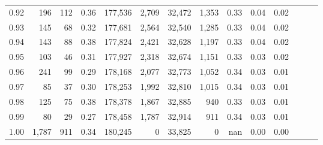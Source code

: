 \begin{tabular}{rrrrrrrrrrrrrr}
0.92 &    196 &  112 &  0.36 &  177,536 &    2,709 &  32,472 &   1,353 &  0.33 &  0.04 &      0.02 \\
0.93 &    145 &   68 &  0.32 &  177,681 &    2,564 &  32,540 &   1,285 &  0.33 &  0.04 &      0.02 \\
0.94 &    143 &   88 &  0.38 &  177,824 &    2,421 &  32,628 &   1,197 &  0.33 &  0.04 &      0.02 \\
0.95 &    103 &   46 &  0.31 &  177,927 &    2,318 &  32,674 &   1,151 &  0.33 &  0.03 &      0.02 \\
0.96 &    241 &   99 &  0.29 &  178,168 &    2,077 &  32,773 &   1,052 &  0.34 &  0.03 &      0.01 \\
0.97 &     85 &   37 &  0.30 &  178,253 &    1,992 &  32,810 &   1,015 &  0.34 &  0.03 &      0.01 \\
0.98 &    125 &   75 &  0.38 &  178,378 &    1,867 &  32,885 &     940 &  0.33 &  0.03 &      0.01 \\
0.99 &     80 &   29 &  0.27 &  178,458 &    1,787 &  32,914 &     911 &  0.34 &  0.03 &      0.01 \\
1.00 &  1,787 &  911 &  0.34 &  180,245 &        0 &  33,825 &       0 &   nan &  0.00 &      0.00 \\
\bottomrule
\end{tabular}
